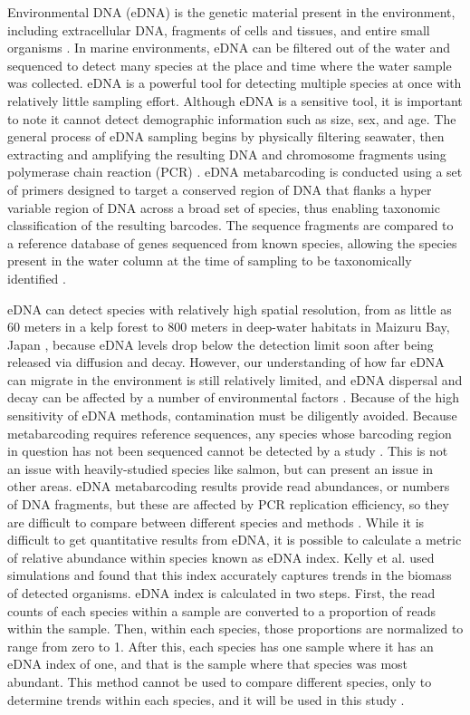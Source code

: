 \documentclass[12pt,twoside]{reedthesis}
\begin{document}
Environmental DNA (eDNA) is the genetic material present in the environment, including extracellular DNA, fragments of cells and tissues, and entire small organisms \autocite{Taberlet2018}. In marine environments, eDNA can be filtered out of the water and sequenced to detect many species at the place and time where the water sample was collected. eDNA is a powerful tool for detecting multiple species at once with relatively little sampling effort. Although eDNA is a sensitive tool, it is important to note it cannot detect demographic information such as size, sex, and age. The general process of eDNA sampling begins by physically filtering seawater, then extracting and amplifying the resulting DNA and chromosome fragments using polymerase chain reaction (PCR) \autocite{Power2023}. eDNA metabarcoding is conducted using a set of  primers designed to target a conserved region of DNA that flanks a hyper variable region of DNA across a broad set of species, thus enabling taxonomic classification of the resulting barcodes. The sequence fragments are compared to a reference database of genes sequenced from known species, allowing the species present in the water column at the time of sampling to be taxonomically identified \autocite{Miya2022}.

eDNA can detect species with relatively high spatial resolution, from as little as 60 meters in a kelp forest \autocite{Port2016} to 800 meters in deep-water habitats in Maizuru Bay, Japan \autocite{Yamamoto2017}, because eDNA levels drop below the detection limit soon after being released via diffusion and decay. However, our understanding of how far eDNA can migrate in the environment is still relatively limited, and eDNA dispersal and decay can be affected by a number of environmental factors \autocite{Cristescu2018}. Because of the high sensitivity of eDNA methods, contamination must be diligently avoided. Because metabarcoding requires reference sequences, any species whose barcoding region in question has not been sequenced cannot be detected by a study \autocite{Miya2022}. This is not an issue with heavily-studied species like salmon, but can present an issue in other areas. eDNA metabarcoding results provide read abundances, or numbers of DNA fragments, but these are affected by PCR replication efficiency, so they are difficult to compare between different species and methods \autocite{Miya2022}. While it is difficult to get quantitative results from eDNA, it is possible to calculate a metric of relative abundance within species known as eDNA index. Kelly et al. used simulations and found that this index accurately captures trends in the biomass of detected organisms. eDNA index is calculated in two steps. First, the read counts of each species within a sample are converted to a proportion of reads within the sample. Then, within each species, those proportions are normalized to range from zero to 1. After this, each species has one sample where it has an eDNA index of one, and that is the sample where that species was most abundant. This method cannot be used to compare different species, only to determine trends within each species, and it will be used in this study \autocite{Kelly2019}.
\end{document}
